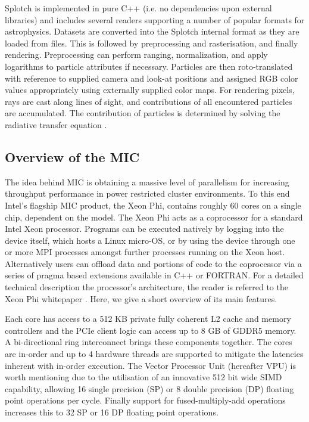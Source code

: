 \documentclass[runningheads,a4paper]{llncs}
\begin{document}
Splotch \cite{splotch} is implemented in pure C++ (i.e. no dependencies upon external libraries) and includes several readers 
supporting a number of popular formats for astrophysics. Datasets are converted into the Splotch internal format as they are 
loaded from files. This is followed by preprocessing and rasterisation, and finally rendering. 
Preprocessing can perform ranging, normalization, 
and apply logarithms to particle attributes if necessary. Particles are then roto-translated with reference to supplied 
camera and look-at positions and assigned RGB color values appropriately using externally supplied color maps. For rendering 
pixels, rays are cast along lines of sight, and contributions of all encountered particles are accumulated. The contribution 
of particles is determined by solving the radiative transfer equation \cite{splotchgpu}.

\subsection{Overview of the MIC}
\label{sect:micoverview}

The idea behind MIC is obtaining a massive level of parallelism for increasing throughput performance in power restricted cluster 
environments. To this end Intel's flagship MIC product, the Xeon Phi, contains roughly 60 cores on a single chip, dependent on the 
model. The Xeon Phi acts as a coprocessor for a standard Intel Xeon processor. Programs can be executed natively by logging into 
the device itself, which hosts a Linux micro-OS, or by using the device through one or more MPI processes amongst further processes 
running on the Xeon host. Alternatively users can offload data and portions of code to the coprocessor via a series of pragma 
based extensions available in C++ or FORTRAN.
For a detailed technical description the processor's architecture, the reader is referred to the
Xeon Phi whitepaper \cite{xeonphi}. Here, we give a short overview of its main features.

Each core has access to a 512 KB private fully coherent L2 cache and memory controllers
and the PCIe client logic can access up to 8 GB of GDDR5 memory. A bi-directional ring interconnect
brings these components together. The cores are in-order and up to 4 hardware threads are supported to mitigate
the latencies inherent with in-order execution. The Vector Processor Unit (hereafter VPU) is worth mentioning due to
the utilisation of an innovative 512 bit wide SIMD capability, allowing 16 single precision (SP) or 8 double precision
(DP) floating point operations per cycle. Finally support for fused-multiply-add operations increases this to 32 SP or 16 DP
floating point operations.
\end{document}
